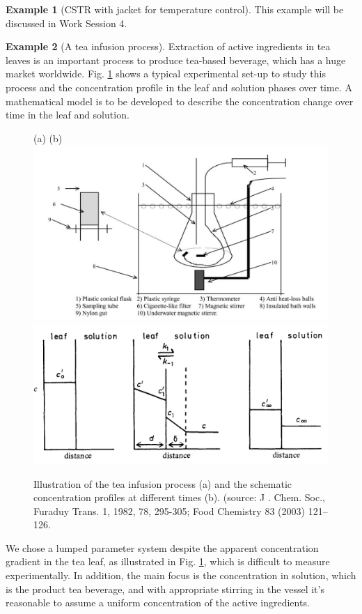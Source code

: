 \documentclass[a4paper,11pt]{article}
\theoremstyle{definition}
\newtheorem{exmp}{Example}[section]
\begin{document}
\begin{exmp}[CSTR with jacket for temperature control]
This example will be discussed in Work Session 4.
\end{exmp}


\begin{exmp}[A tea infusion process]
Extraction of active ingredients in tea leaves is an important process to produce tea-based beverage,
which has a huge market worldwide. Fig. \ref{fig:tea} shows a typical experimental set-up to study
this process and the concentration profile in the leaf and solution phases over time.
A mathematical model is to be developed to describe the concentration change over time in the leaf and solution.
\begin{figure}[!h]
 \begin{center}
 	(a)	\hspace{6cm} (b) \\
	\includegraphics[width=.495\textwidth]{tea}
	\includegraphics[width=.495\textwidth]{tea_model}	
 \end{center}
 \caption{Illustration of the tea infusion process (a) and the schematic concentration profiles at different times (b).
 	(source: J . Chem. Soc., Furaduy Trans. 1, 1982, 78, 295-305; Food Chemistry 83 (2003) 121–126.} 
 \label{fig:tea}
\end{figure}

We chose a lumped parameter system despite the apparent concentration gradient in the tea leaf,
as illustrated in Fig. \ref{fig:tea}, which is difficult to measure experimentally.
In addition, the main focus is the concentration in solution, which is the product tea beverage, 
and with appropriate stirring in the vessel it's reasonable to assume a uniform concentration of the active ingredients.


\end{exmp}
\end{document}
